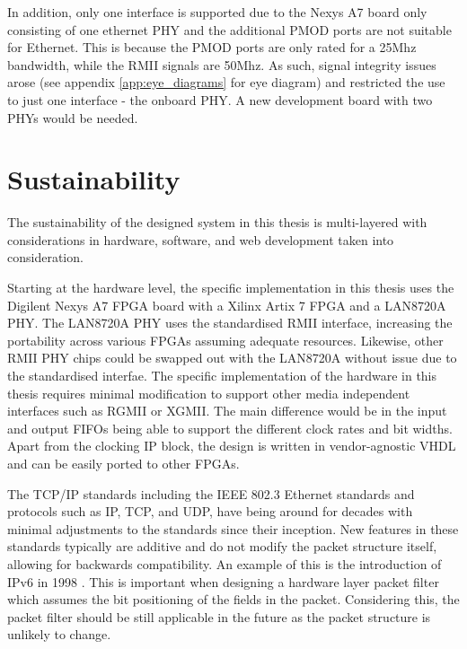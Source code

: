 In addition, only one interface is supported due to the Nexys A7 board only consisting of one ethernet PHY and the additional PMOD ports are not suitable for Ethernet. This is because the PMOD ports are only rated for a 25Mhz bandwidth, while the RMII signals are 50Mhz. As such, signal integrity issues arose (see appendix \ref{app:eye_diagrams} for eye diagram) and restricted the use to just one interface - the onboard PHY. A new development board with two PHYs would be needed.











\section{Sustainability}



The sustainability of the designed system in this thesis is multi-layered with considerations in hardware, software, and web development taken into consideration. 

Starting at the hardware level, the specific implementation in this thesis uses the Digilent Nexys A7 FPGA board with a Xilinx Artix 7 FPGA and a LAN8720A PHY. The LAN8720A PHY uses the standardised RMII interface, increasing the portability across various FPGAs assuming adequate resources. Likewise, other RMII PHY chips could be swapped out with the LAN8720A without issue due to the standardised interfae. The specific implementation of the hardware in this thesis requires minimal modification to support other media independent interfaces such as RGMII or XGMII. The main difference would be in the input and output FIFOs being able to support the different clock rates and bit widths. Apart from the clocking IP block, the design is written in vendor-agnostic VHDL and can be easily ported to other FPGAs. 

The TCP/IP standards including the IEEE 802.3 Ethernet standards and protocols such as IP, TCP, and UDP, have being around for decades with minimal adjustments to the standards since their inception. New features in these standards typically are additive and do not modify the packet structure itself, allowing for backwards compatibility. An example of this is the introduction of IPv6 in 1998 \cite{rfc2460}. This is important when designing a hardware layer packet filter which assumes the bit positioning of the fields in the packet. Considering this, the packet filter should be still applicable in the future as the packet structure is unlikely to change.


